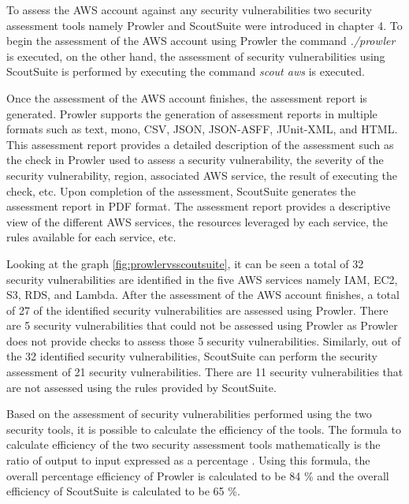 \par To assess the AWS account against any security vulnerabilities two security assessment tools namely Prowler and ScoutSuite were introduced in chapter 4. To begin the assessment of the AWS account using Prowler the command \textit{./prowler} is executed, on the other hand, the assessment of security vulnerabilities using ScoutSuite is performed by executing the command \textit{scout aws} is executed.

\par Once the assessment of the AWS account finishes, the assessment report is generated. Prowler supports the generation of assessment reports in multiple formats such as text, mono, CSV, JSON, JSON-ASFF, JUnit-XML, and HTML. This assessment report provides a detailed description of the assessment such as the check in Prowler used to assess a security vulnerability, the severity of the security vulnerability, region, associated AWS service, the result of executing the check, etc. Upon completion of the assessment, ScoutSuite generates the assessment report in PDF format. The assessment report provides a descriptive view of the different AWS services, the resources leveraged by each service, the rules available for each service, etc.

\par Looking at the graph \ref{fig:prowlervsscoutsuite}, it can be seen a total of 32 security vulnerabilities are identified in the five AWS services namely IAM, EC2, S3, RDS, and Lambda. After the assessment of the AWS account finishes, a total of 27 of the identified security vulnerabilities are assessed using Prowler. There are 5 security vulnerabilities that could not be assessed using Prowler as Prowler does not provide checks to assess those 5 security vulnerabilities. Similarly, out of the 32 identified security vulnerabilities, ScoutSuite can perform the security assessment of 21 security vulnerabilities. There are 11 security vulnerabilities that are not assessed using the rules provided by ScoutSuite.

\par Based on the assessment of security vulnerabilities performed using the two security tools, it is possible to calculate the efficiency of the tools. The formula to calculate efficiency of the two security assessment tools mathematically is the ratio of output to input expressed as a percentage \cite{88}. Using this formula, the overall percentage efficiency of Prowler is calculated to be 84 \% and the overall efficiency of ScoutSuite is calculated to be 65 \%.

